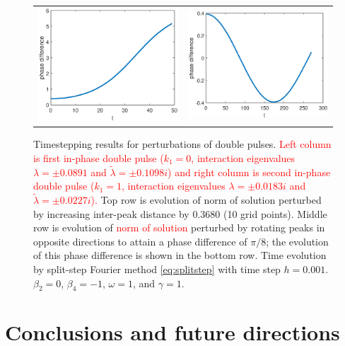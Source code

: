\documentclass[12pt]{elsarticle}
\newcommand{\revised}[1]{ \textcolor{red}{#1} }
\begin{document}
\begin{figure}[H]
\begin{tabular}{cc}
\includegraphics[width=6cm]{images/DP0ppphasedifference} &
\includegraphics[width=6cm]{images/DP1ppphasedifference}
\end{tabular}
\caption{Timestepping results for perturbations of double pulses. \revised{Left column is first in-phase double pulse ($k_1 = 0$, interaction eigenvalues $\lambda = \pm 0.0891$ and $\tilde{\lambda} = \pm 0.1098 i$) and right column is second in-phase double pulse ($k_1 = 1$, interaction eigenvalues $\lambda = \pm 0.0183i$ and $\tilde{\lambda} = \pm 0.0227 i$).} Top row is evolution of norm of solution perturbed by increasing inter-peak distance by $0.3680$ (10 grid points). Middle row is evolution of \revised{norm of solution} perturbed by rotating peaks in opposite directions to attain a phase difference of $\pi/8$; the evolution of this phase difference is shown in the bottom row. Time evolution by split-step Fourier method \cref{eq:splitstep} with time step $h = 0.001$. $\beta_2 = 0$, $\beta_4 = -1$, $\omega = 1$, and $\gamma = 1$.}
\label{fig:timestep0pp}
\end{figure}

\section{Conclusions and future directions}
\end{document}
